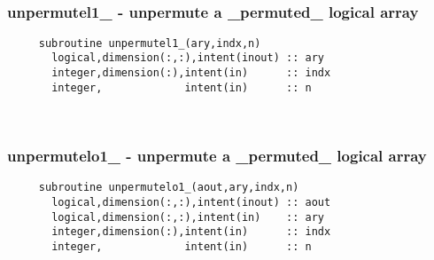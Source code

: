  
\mbox{}\hrulefill\ 
 

  \subsubsection{unpermutel1\_ - unpermute a \_permuted\_ logical array}

\begin{verbatim} 
     subroutine unpermutel1_(ary,indx,n)
       logical,dimension(:,:),intent(inout) :: ary
       integer,dimension(:),intent(in)      :: indx
       integer,             intent(in)      :: n
 \end{verbatim}%
 
 
\mbox{}\hrulefill\ 
 

  \subsubsection{unpermutelo1\_ - unpermute a \_permuted\_ logical array}

\begin{verbatim} 
     subroutine unpermutelo1_(aout,ary,indx,n)
       logical,dimension(:,:),intent(inout) :: aout
       logical,dimension(:,:),intent(in)    :: ary
       integer,dimension(:),intent(in)      :: indx
       integer,             intent(in)      :: n
 \end{verbatim}%


 
\mbox{}\hrulefill\ 

